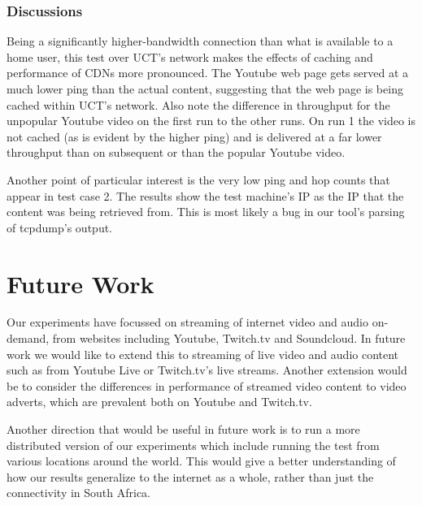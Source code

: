 \documentclass{sig-alternate-05-2015}
\begin{document}
\subsubsection{Discussions}
Being a significantly higher-bandwidth connection than what is available to a home user, this test over UCT's network makes the effects of caching and performance of CDNs more pronounced. The Youtube web page  gets served at a much lower ping than the actual content, suggesting that the web page is being cached within UCT's network. Also note the difference in throughput for the unpopular Youtube video on the first run to the other runs. On run 1 the video is not cached (as is evident by the higher ping) and is delivered at a far lower throughput than on subsequent or than the popular Youtube video.

Another point of particular interest is the very low ping and hop counts that appear in test case 2. The results show the test machine's IP as the IP that the content was being retrieved from. This is most likely a bug in our tool's parsing of tcpdump's output.

\section{Future Work}\label{sec:futurework}
Our experiments have focussed on streaming of internet video and audio on-demand, from websites including Youtube, Twitch.tv and Soundcloud. In future work we would like to extend this to streaming of live video and audio content such as from Youtube Live or Twitch.tv's live streams. Another extension would be to consider the differences in performance of streamed video content to video adverts, which are prevalent both on Youtube and Twitch.tv.

Another direction that would be useful in future work is to run a more distributed version of our experiments which include running the test from various locations around the world. This would give a better understanding of how our results generalize to the internet as a whole, rather than just the connectivity in South Africa.

\small


\end{document}
